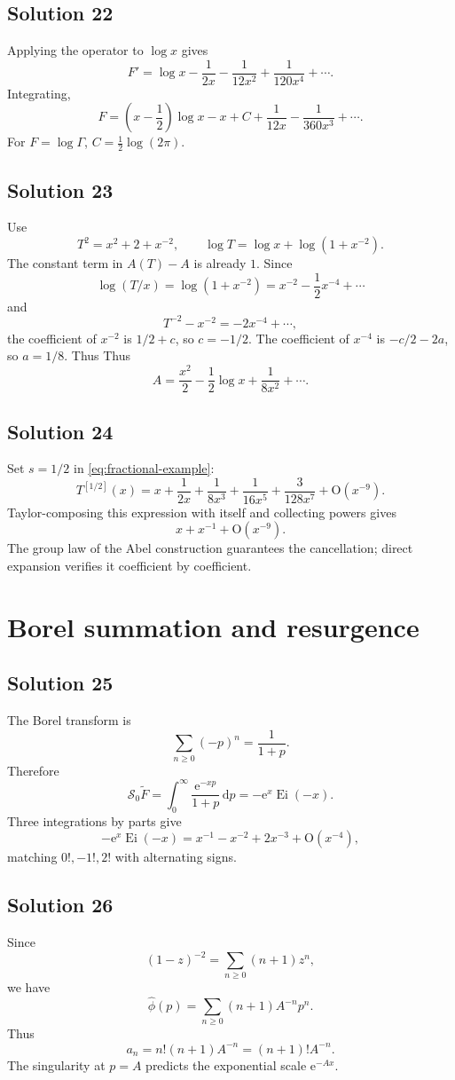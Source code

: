 \documentclass[11pt,openany]{book}
\theoremstyle{plain}
\theoremstyle{definition}
\theoremstyle{remark}
\newcommand{\Ei}{\operatorname{Ei}}
\newcommand{\bigO}{\mathrm{O}}
\newcommand{\dd}{\,\mathrm{d}}
\newcommand{\e}{\mathrm{e}}
\begin{document}
\subsection*{Solution 22}
Applying the operator to $\log x$ gives
\[
 F'=\log x-\frac1{2x}-\frac1{12x^2}
 +\frac1{120x^4}+\cdots.
\]
Integrating,
\[
 F=\left(x-\frac12\right)\log x-x+C
 +\frac1{12x}-\frac1{360x^3}+\cdots.
\]
For $F=\log\Gamma$, $C=\frac12\log(2\pi)$.

\subsection*{Solution 23}
Use
\[
 T^2=x^2+2+x^{-2},
 \qquad
 \log T=\log x+\log(1+x^{-2}).
\]
The constant term in $A(T)-A$ is already $1$. Since
\[
 \log(T/x)=\log(1+x^{-2})=x^{-2}-\frac12x^{-4}+\cdots
\]
and
\[
 T^{-2}-x^{-2}=-2x^{-4}+\cdots,
\]
the coefficient of $x^{-2}$ is $1/2+c$, so $c=-1/2$. The coefficient of $x^{-4}$ is $-c/2-2a$, so $a=1/8$. Thus
Thus
\[
 A=\frac{x^2}{2}-\frac12\log x+\frac1{8x^2}+\cdots.
\]

\subsection*{Solution 24}
Set $s=1/2$ in \cref{eq:fractional-example}:
\[
 T^{[1/2]}(x)=x+\frac1{2x}
 +\frac1{8x^3}+\frac1{16x^5}
 +\frac{3}{128x^7}+\bigO(x^{-9}).
\]
Taylor-composing this expression with itself and collecting powers gives
\[
 x+x^{-1}+\bigO(x^{-9}).
\]
The group law of the Abel construction guarantees the cancellation; direct expansion verifies it coefficient by coefficient.

\section{Borel summation and resurgence}

\subsection*{Solution 25}
The Borel transform is
\[
 \sum_{n\ge0}(-p)^n=\frac1{1+p}.
\]
Therefore
\[
 \mathscr S_0\widetilde F
 =\int_0^\infty\frac{\e^{-xp}}{1+p}\dd p
 =-\e^x\Ei(-x).
\]
Three integrations by parts give
\[
 -\e^x\Ei(-x)
 =x^{-1}-x^{-2}+2x^{-3}+\bigO(x^{-4}),
\]
matching $0!, -1!, 2!$ with alternating signs.

\subsection*{Solution 26}
Since
\[
 (1-z)^{-2}=\sum_{n\ge0}(n+1)z^n,
\]
we have
\[
 \widehat\phi(p)=\sum_{n\ge0}(n+1)A^{-n}p^n.
\]
Thus
\[
 a_n=n!(n+1)A^{-n}=(n+1)!A^{-n}.
\]
The singularity at $p=A$ predicts the exponential scale $\e^{-Ax}$.
\end{document}
